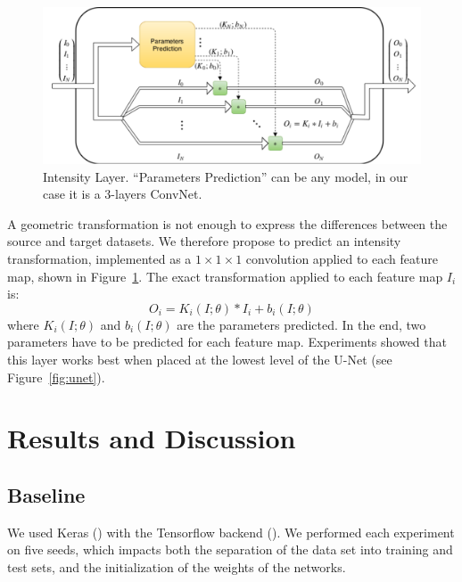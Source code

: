 \begin{figure}
	\includegraphics[width=\textwidth]{img_transfer/Intensity_Block}
    \caption{Intensity Layer. ``Parameters Prediction'' can be any model, in our case it is a 3-layers ConvNet.}
    \label{fig:block}
\end{figure}

A geometric transformation is not enough to express the differences between the source and target datasets. We therefore propose to predict an intensity transformation, implemented as a $1 \times 1 \times 1$ convolution applied to each feature map, shown in Figure~\ref{fig:block}. The exact transformation applied to each feature map $I_i$ is:
\begin{equation*}
O_i = K_i \left( I; \theta \right) * I_i + b_i \left( I; \theta \right)
\end{equation*}
where $K_i \left( I; \theta \right)$ and $b_i \left( I; \theta \right)$ are the parameters predicted. In the end, two parameters have to be predicted for each feature map. Experiments showed that this layer works best when placed at the lowest level of the U-Net (see Figure~\ref{fig:unet}).

\section{Results and Discussion}
\label{sec:kidney_res}

\subsection{Baseline}
\label{ssec:baseline}

We used Keras (\textcite{chollet2015keras}) with the Tensorflow backend (\textcite{tensorflow2015}). We performed each experiment on five seeds, which impacts both the separation of the data set into training and test sets, and the initialization of the weights of the networks.

